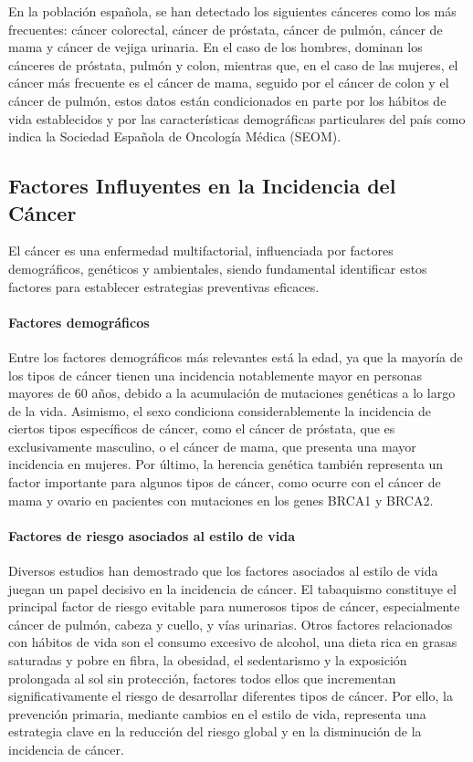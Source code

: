 En la población española, se han detectado los siguientes cánceres como los más frecuentes: cáncer colorectal, cáncer de próstata, cáncer de pulmón, cáncer de mama y cáncer de vejiga urinaria. En el caso de los hombres, dominan los cánceres de próstata, pulmón y colon, mientras que, en el caso de las mujeres, el cáncer más frecuente es el cáncer de mama, seguido por el cáncer de colon y el cáncer de pulmón, estos datos están condicionados en parte por los hábitos de vida establecidos y por las características demográficas particulares del país como indica la Sociedad Española de Oncología Médica (SEOM). 

\subsection{Factores Influyentes en la Incidencia del Cáncer}
\label{sec:influencing-factors} 

El cáncer es una enfermedad multifactorial, influenciada por factores demográficos, genéticos y ambientales, siendo fundamental identificar estos factores para establecer estrategias preventivas eficaces. 

\paragraph{Factores demográficos} 

Entre los factores demográficos más relevantes está la edad, ya que la mayoría de los tipos de cáncer tienen una incidencia notablemente mayor en personas mayores de 60 años, debido a la acumulación de mutaciones genéticas a lo largo de la vida. Asimismo, el sexo condiciona considerablemente la incidencia de ciertos tipos específicos de cáncer, como el cáncer de próstata, que es exclusivamente masculino, o el cáncer de mama, que presenta una mayor incidencia en mujeres\cite{cancer_risk_factors}. Por último, la herencia genética también representa un factor importante para algunos tipos de cáncer, como ocurre con el cáncer de mama y ovario en pacientes con mutaciones en los genes BRCA1 y BRCA2. 

\paragraph{Factores de riesgo asociados al estilo de vida} 

Diversos estudios han demostrado que los factores asociados al estilo de vida juegan un papel decisivo en la incidencia de cáncer. El tabaquismo constituye el principal factor de riesgo evitable para numerosos tipos de cáncer, especialmente cáncer de pulmón, cabeza y cuello, y vías urinarias\cite{restrepo1988relacion}. Otros factores relacionados con hábitos de vida son el consumo excesivo de alcohol, una dieta rica en grasas saturadas y pobre en fibra, la obesidad, el sedentarismo y la exposición prolongada al sol sin protección, factores todos ellos que incrementan significativamente el riesgo de desarrollar diferentes tipos de cáncer\cite{PAPPS2024}. Por ello, la prevención primaria, mediante cambios en el estilo de vida, representa una estrategia clave en la reducción del riesgo global y en la disminución de la incidencia de cáncer.

